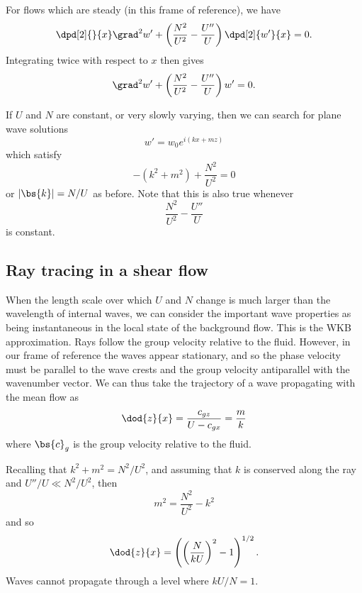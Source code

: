 For flows which are steady (in this frame of reference), we have
\begin{equation}
	\dpd[2]{}{x} \grad^2 w' + \left( \frac{N^2}{U^2} - \frac{U''}{U} \right)\dpd[2]{w'}{x} = 0.
\end{equation}
Integrating twice with respect to $x$ then gives
\begin{equation}
	\grad^2 w' + \left( \frac{N^2}{U^2} - \frac{U''}{U} \right) w' = 0.
\end{equation}

If $U$ and $N$ are constant, or very slowly varying, then we can search for plane wave solutions
\begin{equation}
	w' = w_0 e^{i(kx+mz)}
\end{equation}
which satisfy
\begin{equation}
	-(k^2 + m^2) + \frac{N^2}{U^2} = 0
\end{equation}
or $|\bs{k}| = N/U$ as before. Note that this is also true whenever
\begin{equation}
	\frac{N^2}{U^2} - \frac{U''}{U} 
\end{equation}
is constant.

\subsection{Ray tracing in a shear flow}

When the length scale over which $U$ and $N$ change is much larger than the
wavelength of internal waves, we can consider the important wave properties as
being instantaneous in the local state of the background flow. This is the WKB
approximation. Rays follow the group velocity relative to the fluid. However, in
our frame of reference the waves appear stationary, and so the phase velocity
must be parallel to the wave crests and the group velocity antiparallel with the
wavenumber vector. We can thus take the trajectory of a wave propagating with
the mean flow as
\begin{equation}
	\dod{z}{x} = \frac{c_{gz}}{U - c_{gx}} = \frac{m}{k}
\end{equation}
where $\bs{c}_g$ is the group velocity relative to the fluid.

Recalling that $k^2 + m^2 = N^2 / U^2$, and assuming that $k$ is conserved along the ray and $U''/U \ll N^2 /U^2$, then
\begin{equation}
	m^2 = \frac{N^2}{U^2} - k^2
\end{equation}
and so 
\begin{equation}
	\dod{z}{x} = \left(\left(\frac{N}{kU}\right)^2 - 1\right)^{1/2}.
\end{equation}
Waves cannot propagate through a level where $kU/N = 1$.

